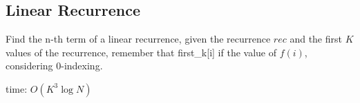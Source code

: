 \subsection{Linear Recurrence}

Find the n-th term of a linear recurrence, given the recurrence $rec$ and the first $K$ values of the recurrence, remember that first\_k[i] if the value of $f(i)$, considering 0-indexing. 

time: $O(K^{3} \log{N})$
